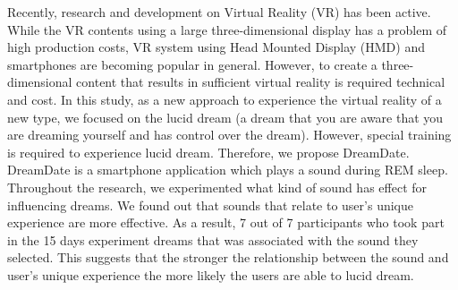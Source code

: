 \begin{jabstract}

\end{jabstract}

\begin{eabstract}
Recently, research and development on Virtual Reality (VR) has been active. While the VR contents using a large three-dimensional display has a problem of high production costs, VR system using Head Mounted Display (HMD) and smartphones are becoming popular in general. However, to create a three-dimensional content that results in sufficient virtual reality is required technical and cost. In this study, as a new approach to experience the virtual reality of a new type, we focused on the lucid dream (a dream that you are aware that you are dreaming yourself and has control over the dream). However, special training is required to experience lucid dream. Therefore, we propose DreamDate. DreamDate is a smartphone application which plays a sound during REM sleep. Throughout the research, we experimented what kind of sound has effect for  influencing dreams. We found out that sounds that relate to user's unique experience are more effective. As a result, 7 out of 7 participants who took part in the 15 days experiment dreams that was associated with the sound they selected. This suggests that the stronger the relationship between the sound and user's unique experience the more likely the users are able to lucid dream.
\end{eabstract}